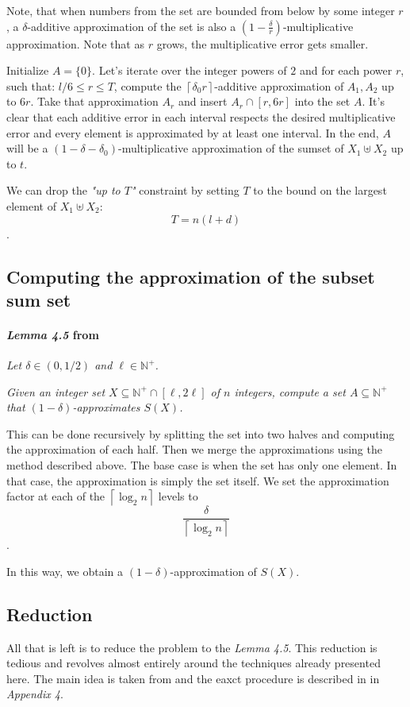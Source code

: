 Note, that when numbers from the set are bounded from below by some integer $r$, a \(\delta\)-additive approximation of the set is also a \((1 - \tfrac{\delta}{r})\)-multiplicative approximation. Note that as $r$ grows, the multiplicative error gets smaller.

Initialize $A=\{0\}$. Let's iterate over the integer powers of $2$ and for each power $r$, such that: $l/6 \le r \le T$, compute the $\left\lceil \delta_0r \right\rceil$-additive  approximation of $A_1, A_2$ up to $6r$. Take that approximation $A_r$ and insert $A_r \cap [r, 6r]$ into the set $A$. It's clear that each additive error in each interval respects the desired multiplicative error and every element is approximated by at least one interval. In the end, $A$ will be a \((1 - \delta - \delta_0)\)-multiplicative approximation of the sumset of $X_1 \uplus X_2$ up to $t$. 

We can drop the \textit{"up to $T$"} constraint by setting $T$ to the bound on the largest element of $X_1 \uplus X_2$: \[T = n  (l + d)\].

\subsection{Computing the approximation of the subset sum set}
\paragraph{\textit{Lemma 4.5} from \cite{deng}} \textit{Let \( \delta \in (0, 1/2) \) and \( \ell \in \mathbb{N}^+ \).}

\textit{Given an integer set \( X \subseteq \mathbb{N}^+ \cap [\ell, 2\ell] \) of \( n \) integers, compute a set \( A \subseteq \mathbb{N}^+ \) that \( (1 - \delta) \)-approximates \( S(X) \).}

This can be done recursively by splitting the set into two halves and computing the approximation of each half. Then we merge the approximations using the method described above. The base case is when the set has only one element. In that case, the approximation is simply the set itself. We set the approximation factor at each of the $\left \lceil \log_2n \right \rceil$ levels to 
\[\frac{\delta}{\left \lceil \log_2n \right \rceil} \]. 

In this way, we obtain a $(1 - \delta)$-approximation of $S(X)$.

\subsection{Reduction}
All that is left is to reduce the \Partition problem to the \textit{Lemma 4.5}. This reduction is tedious and revolves almost entirely around the techniques already presented here. The main idea is taken from \cite{mucha} and the eaxct procedure is described in \cite{deng} in \textit{Appendix 4}.

